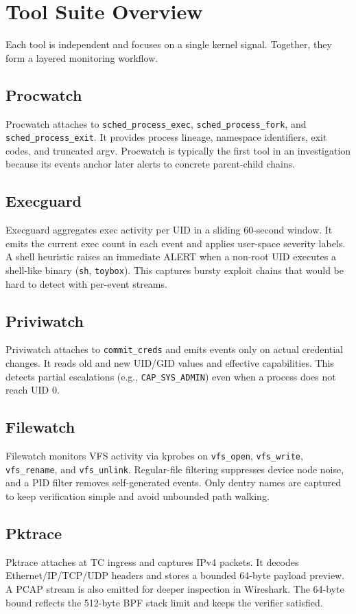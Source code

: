 \documentclass[conference]{IEEEtran}
\begin{document}
\section{Tool Suite Overview}
Each tool is independent and focuses on a single kernel signal. Together, they form a layered monitoring workflow.

\subsection{Procwatch}
Procwatch attaches to \texttt{sched\_process\_exec}, \texttt{sched\_process\_fork}, and \texttt{sched\_process\_exit}. It provides process lineage, namespace identifiers, exit codes, and truncated argv. Procwatch is typically the first tool in an investigation because its events anchor later alerts to concrete parent-child chains.

\subsection{Execguard}
Execguard aggregates exec activity per UID in a sliding 60-second window. It emits the current exec count in each event and applies user-space severity labels. A shell heuristic raises an immediate ALERT when a non-root UID executes a shell-like binary (\texttt{sh}, \texttt{toybox}). This captures bursty exploit chains that would be hard to detect with per-event streams.

\subsection{Priviwatch}
Priviwatch attaches to \texttt{commit\_creds} and emits events only on actual credential changes. It reads old and new UID/GID values and effective capabilities. This detects partial escalations (e.g., \texttt{CAP\_SYS\_ADMIN}) even when a process does not reach UID 0.\cite{android_ebpf_monitor}

\subsection{Filewatch}
Filewatch monitors VFS activity via kprobes on \texttt{vfs\_open}, \texttt{vfs\_write}, \texttt{vfs\_rename}, and \texttt{vfs\_unlink}. Regular-file filtering suppresses device node noise, and a PID filter removes self-generated events. Only dentry names are captured to keep verification simple and avoid unbounded path walking.

\subsection{Pktrace}
Pktrace attaches at TC ingress and captures IPv4 packets. It decodes Ethernet/IP/TCP/UDP headers and stores a bounded 64-byte payload preview. A PCAP stream is also emitted for deeper inspection in Wireshark. The 64-byte bound reflects the 512-byte BPF stack limit and keeps the verifier satisfied.
\end{document}
